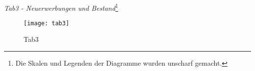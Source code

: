 \clearpage
    
    

    \recalctypearea
    \textit{Tab3 - Neuerwerbungen und Bestand}\footnote{ Die Skalen und Legenden der Diagramme wurden unscharf gemacht.}
    \begin{figure}[H]
        \centering
            \texttt{[image: tab3]}
            \caption{Tab3}
            \label{fig:tab3}
    \end{figure}

    \recalctypearea 
    \begingroup
    \setlength{\tabcolsep}{12pt} %
    \renewcommand{\arraystretch}{1.0} 
